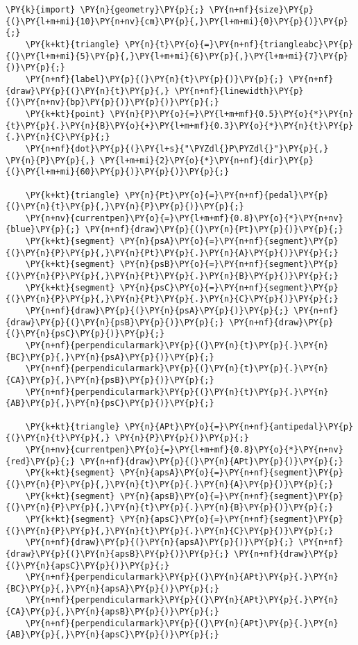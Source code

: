 \begin{Verbatim}[commandchars=\\\{\}]
    \PY{k}{import} \PY{n}{geometry}\PY{p}{;} \PY{n+nf}{size}\PY{p}{(}\PY{l+m+mi}{10}\PY{n+nv}{cm}\PY{p}{,}\PY{l+m+mi}{0}\PY{p}{)}\PY{p}{;}
    \PY{k+kt}{triangle} \PY{n}{t}\PY{o}{=}\PY{n+nf}{triangleabc}\PY{p}{(}\PY{l+m+mi}{5}\PY{p}{,}\PY{l+m+mi}{6}\PY{p}{,}\PY{l+m+mi}{7}\PY{p}{)}\PY{p}{;}
    \PY{n+nf}{label}\PY{p}{(}\PY{n}{t}\PY{p}{)}\PY{p}{;} \PY{n+nf}{draw}\PY{p}{(}\PY{n}{t}\PY{p}{,} \PY{n+nf}{linewidth}\PY{p}{(}\PY{n+nv}{bp}\PY{p}{)}\PY{p}{)}\PY{p}{;}
    \PY{k+kt}{point} \PY{n}{P}\PY{o}{=}\PY{l+m+mf}{0.5}\PY{o}{*}\PY{n}{t}\PY{p}{.}\PY{n}{B}\PY{o}{+}\PY{l+m+mf}{0.3}\PY{o}{*}\PY{n}{t}\PY{p}{.}\PY{n}{C}\PY{p}{;}
    \PY{n+nf}{dot}\PY{p}{(}\PY{l+s}{"\PYZdl{}P\PYZdl{}"}\PY{p}{,} \PY{n}{P}\PY{p}{,} \PY{l+m+mi}{2}\PY{o}{*}\PY{n+nf}{dir}\PY{p}{(}\PY{l+m+mi}{60}\PY{p}{)}\PY{p}{)}\PY{p}{;}

    \PY{k+kt}{triangle} \PY{n}{Pt}\PY{o}{=}\PY{n+nf}{pedal}\PY{p}{(}\PY{n}{t}\PY{p}{,}\PY{n}{P}\PY{p}{)}\PY{p}{;}
    \PY{n+nv}{currentpen}\PY{o}{=}\PY{l+m+mf}{0.8}\PY{o}{*}\PY{n+nv}{blue}\PY{p}{;} \PY{n+nf}{draw}\PY{p}{(}\PY{n}{Pt}\PY{p}{)}\PY{p}{;}
    \PY{k+kt}{segment} \PY{n}{psA}\PY{o}{=}\PY{n+nf}{segment}\PY{p}{(}\PY{n}{P}\PY{p}{,}\PY{n}{Pt}\PY{p}{.}\PY{n}{A}\PY{p}{)}\PY{p}{;}
    \PY{k+kt}{segment} \PY{n}{psB}\PY{o}{=}\PY{n+nf}{segment}\PY{p}{(}\PY{n}{P}\PY{p}{,}\PY{n}{Pt}\PY{p}{.}\PY{n}{B}\PY{p}{)}\PY{p}{;}
    \PY{k+kt}{segment} \PY{n}{psC}\PY{o}{=}\PY{n+nf}{segment}\PY{p}{(}\PY{n}{P}\PY{p}{,}\PY{n}{Pt}\PY{p}{.}\PY{n}{C}\PY{p}{)}\PY{p}{;}
    \PY{n+nf}{draw}\PY{p}{(}\PY{n}{psA}\PY{p}{)}\PY{p}{;} \PY{n+nf}{draw}\PY{p}{(}\PY{n}{psB}\PY{p}{)}\PY{p}{;} \PY{n+nf}{draw}\PY{p}{(}\PY{n}{psC}\PY{p}{)}\PY{p}{;}
    \PY{n+nf}{perpendicularmark}\PY{p}{(}\PY{n}{t}\PY{p}{.}\PY{n}{BC}\PY{p}{,}\PY{n}{psA}\PY{p}{)}\PY{p}{;}
    \PY{n+nf}{perpendicularmark}\PY{p}{(}\PY{n}{t}\PY{p}{.}\PY{n}{CA}\PY{p}{,}\PY{n}{psB}\PY{p}{)}\PY{p}{;}
    \PY{n+nf}{perpendicularmark}\PY{p}{(}\PY{n}{t}\PY{p}{.}\PY{n}{AB}\PY{p}{,}\PY{n}{psC}\PY{p}{)}\PY{p}{;}

    \PY{k+kt}{triangle} \PY{n}{APt}\PY{o}{=}\PY{n+nf}{antipedal}\PY{p}{(}\PY{n}{t}\PY{p}{,} \PY{n}{P}\PY{p}{)}\PY{p}{;}
    \PY{n+nv}{currentpen}\PY{o}{=}\PY{l+m+mf}{0.8}\PY{o}{*}\PY{n+nv}{red}\PY{p}{;} \PY{n+nf}{draw}\PY{p}{(}\PY{n}{APt}\PY{p}{)}\PY{p}{;}
    \PY{k+kt}{segment} \PY{n}{apsA}\PY{o}{=}\PY{n+nf}{segment}\PY{p}{(}\PY{n}{P}\PY{p}{,}\PY{n}{t}\PY{p}{.}\PY{n}{A}\PY{p}{)}\PY{p}{;}
    \PY{k+kt}{segment} \PY{n}{apsB}\PY{o}{=}\PY{n+nf}{segment}\PY{p}{(}\PY{n}{P}\PY{p}{,}\PY{n}{t}\PY{p}{.}\PY{n}{B}\PY{p}{)}\PY{p}{;}
    \PY{k+kt}{segment} \PY{n}{apsC}\PY{o}{=}\PY{n+nf}{segment}\PY{p}{(}\PY{n}{P}\PY{p}{,}\PY{n}{t}\PY{p}{.}\PY{n}{C}\PY{p}{)}\PY{p}{;}
    \PY{n+nf}{draw}\PY{p}{(}\PY{n}{apsA}\PY{p}{)}\PY{p}{;} \PY{n+nf}{draw}\PY{p}{(}\PY{n}{apsB}\PY{p}{)}\PY{p}{;} \PY{n+nf}{draw}\PY{p}{(}\PY{n}{apsC}\PY{p}{)}\PY{p}{;}
    \PY{n+nf}{perpendicularmark}\PY{p}{(}\PY{n}{APt}\PY{p}{.}\PY{n}{BC}\PY{p}{,}\PY{n}{apsA}\PY{p}{)}\PY{p}{;}
    \PY{n+nf}{perpendicularmark}\PY{p}{(}\PY{n}{APt}\PY{p}{.}\PY{n}{CA}\PY{p}{,}\PY{n}{apsB}\PY{p}{)}\PY{p}{;}
    \PY{n+nf}{perpendicularmark}\PY{p}{(}\PY{n}{APt}\PY{p}{.}\PY{n}{AB}\PY{p}{,}\PY{n}{apsC}\PY{p}{)}\PY{p}{;}
\end{Verbatim}
